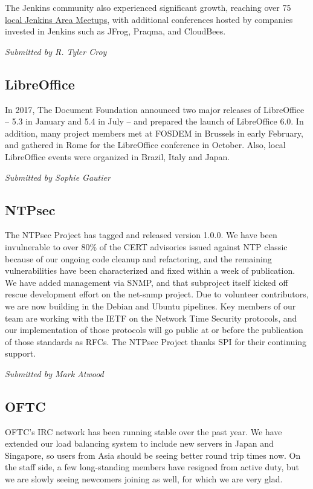 \documentclass[a4paper]{report}
\begin{document}
The Jenkins community also experienced significant growth, reaching over 75
\href{https://meetup.com/pro/jenkins}{local Jenkins Area Meetups}, with
additional conferences hosted by companies invested in Jenkins such as JFrog,
Praqma, and CloudBees.

{\em Submitted by R. Tyler Croy}

\subsection{LibreOffice}

In 2017, The Document Foundation announced two major releases of
LibreOffice -- 5.3 in January and 5.4 in July -- and prepared the launch
of LibreOffice 6.0. In addition, many project members met at FOSDEM in
Brussels in early February, and gathered in Rome for the LibreOffice
conference in October. Also, local LibreOffice events were organized in
Brazil, Italy and Japan.

{\em Submitted by Sophie Gautier}

\subsection{NTPsec}

The NTPsec Project has tagged and released version 1.0.0.  We have been
invulnerable to over 80\% of the CERT advisories issued against NTP
classic because of our ongoing code cleanup and refactoring, and the
remaining vulnerabilities have been characterized and fixed within a
week of publication.   We have added management via SNMP, and that
subproject itself kicked off rescue development effort on the net-snmp
project.  Due to volunteer contributors, we are now building in the
Debian and Ubuntu pipelines.  Key members of our team are working with
the IETF on the Network Time Security protocols, and our implementation
of those protocols will go public at or before the publication of those
standards as RFCs.  The NTPsec Project thanks SPI for their continuing
support.

{\em Submitted by Mark Atwood}

\subsection{OFTC}

OFTC's IRC network has been running stable over the past year. We have
extended our load balancing system to include new servers in Japan and
Singapore, so users from Asia should be seeing better round trip times
now. On the staff side, a few long-standing members have resigned from
active duty, but we are slowly seeing newcomers joining as well, for
which we are very glad.
\end{document}
